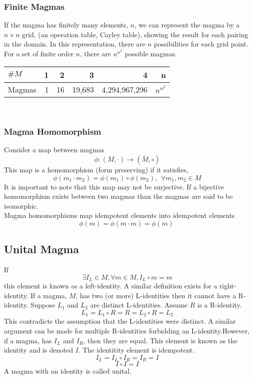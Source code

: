 \documentclass[a4paper]{scrartcl}
\begin{document}
\subsubsection{Finite Magmas}
If the magma has finitely many elements, $n$, we can represent the magma by a $n\times n$ grid, (an operation table, Cayley table), showing the result for each pairing in the domain. In this representation, there are $n$ possibilities for each grid point. For a set of finite order $n$, there are $n^{n^2}$ possible magmas. \\
\begin{tabular}{| l | r | r | r | r | r |} \hline
$\# M$ & 1 & 2 & 3 & 4 & n \\ \hline
Magmas & 1 & 16 & 19,683 & 4,294,967,296 & $n^{n^2}$ \\ \hline
\end{tabular} \\

\subsubsection{Magma Homomorphism}
Consider a map between magmas
$$\phi\colon (M, \cdot) \rightarrow (\bar{M}, \circ)$$
This map is a homomorphism (form preserving) if it satisfies,
$$\phi(m_{1} \cdot m_{2}) = \phi(m_{1}) \circ \phi(m_{2}), \ \ \forall m_{1},m_{2}\in M$$
It is important to note that this map may not be surjective. If a bijective homomorphism exists between two magmas than the magmas are said to be isomorphic.\\
Magma homomorphisms map idempotent elements into idempotent elements
$$\phi(m) = \phi(m \cdot m) = \phi(m) \ $$


\subsection{Unital Magma}
If
$$ \exists I_{L}\in M, \forall m\in M, I_{L}\circ m = m $$
this element is known as a left-identity. A similar definition exists for a right-identity.
If a magma, $M$, has two (or more) L-identities then it cannot have a R-identity.  Suppose $L_{1}$ and $L_{2}$ are distinct L-identities. Assume $R$ is a R-identity.
$$L_{1} = L_{1} \circ R = R = L_{2} \circ R = L_{2}$$
This contradicts the assumption that the L-identities were distinct. A similar argument can be made for multiple R-identities forbidding an L-identity.However, if a magma, has $I_{L}$ and $I_{R}$, then they are equal. This element is known as the identity and is denoted $I$. The identitity element is idempotent.
$$I_{L} = I_{L} \circ I_{R} = I_{R} = I$$
$$I \circ I = I$$  
A magma with an identity is called unital.
\end{document}
